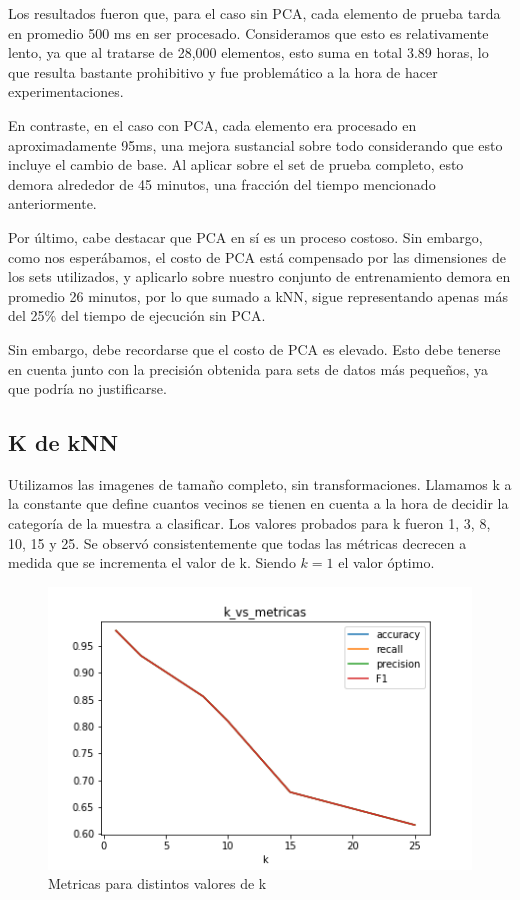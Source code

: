 Los resultados fueron que, para el caso sin PCA, cada elemento de prueba tarda en promedio 500 ms en ser procesado. Consideramos que esto es relativamente lento, ya que al tratarse de 28,000 elementos, esto suma en total 3.89 horas, lo que resulta bastante prohibitivo y fue problemático a la hora de hacer experimentaciones.

En contraste, en el caso con PCA, cada elemento era procesado en aproximadamente 95ms, una mejora sustancial sobre todo considerando que esto incluye el cambio de base. Al aplicar sobre el set de prueba completo, esto demora alrededor de 45 minutos, una fracción del tiempo mencionado anteriormente.

Por último, cabe destacar que PCA en sí es un proceso costoso. Sin embargo, como nos esperábamos, el costo de PCA está compensado por las dimensiones de los sets utilizados, y aplicarlo sobre nuestro conjunto de entrenamiento demora en promedio 26 minutos, por lo que sumado a kNN, sigue representando apenas más del 25\% del tiempo de ejecución sin PCA.

Sin embargo, debe recordarse que el costo de PCA es elevado. Esto debe tenerse en cuenta junto con la precisión obtenida para sets de datos más pequeños, ya que podría no justificarse.

\subsection{K de kNN}

Utilizamos las imagenes de tamaño completo, sin transformaciones. Llamamos k a la constante que define cuantos vecinos se tienen en cuenta a la hora de decidir la categoría de la muestra a clasificar. Los valores probados para k fueron 1, 3, 8, 10, 15 y 25. Se observó consistentemente que todas las métricas decrecen a medida que se incrementa el valor de k. Siendo $k = 1$ el valor óptimo. 

\begin{figure}[H]
    \begin{center}
      \includegraphics[width=0.8\columnwidth]{imagenes/charuli-des/k_vs_metricas.png}
      \caption{Metricas para distintos valores de k}
    \end{center}
\end{figure}

